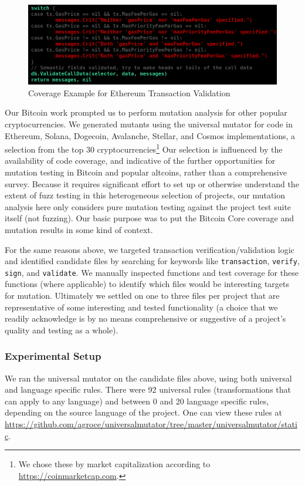 \begin{figure}
\vspace{2mm}
\includegraphics[width=0.9\columnwidth]{coverage-example.png}
\caption{Coverage Example for Ethereum Transaction Validation}
\label{fig:coverage}
\end{figure}

Our Bitcoin work prompted us to perform mutation analysis for other popular cryptocurrencies.
We generated mutants using the universal mutator for code in Ethereum, Solana,
Dogecoin, Avalanche, Stellar, and Cosmos implementations, a selection from the top 30
cryptocurrencies\footnote{We chose these by market capitalization according to
\url{https://coinmarketcap.com}.} Our selection is influenced by the
availability of code coverage, and indicative of the further opportunities for
mutation testing in Bitcoin and popular altcoins, rather than a
comprehensive survey. Because it requires significant effort to set up or
otherwise understand the extent of fuzz testing in this heterogeneous selection
of projects, our mutation analysis here only considers pure mutation testing
against the project test suite itself (not fuzzing).  Our basic
purpose was to put the Bitcoin Core coverage and mutation results in
some kind of context.

For the same reasons above, we targeted transaction verification/validation logic and
identified candidate files by searching for keywords like \texttt{transaction},
\texttt{verify}, \texttt{sign}, and \texttt{validate}. We manually inspected
functions and test coverage for these functions (where applicable) to identify
which files would be interesting targets for mutation. Ultimately we
settled on one to three files per project that are representative of some
interesting and tested functionality (a choice that we readily acknowledge is by
no means comprehensive or suggestive of a project's quality and testing as a
whole).

\subsubsection*{Experimental Setup}
We ran the universal mutator on the candidate files above, using both universal and
language specific rules. There were 92 universal rules (transformations that can apply to
any language) and between 0 and 20 language specific rules, depending on the source language
of the project. One can view these rules
at \url{https://github.com/agroce/universalmutator/tree/master/universalmutator/static}.

